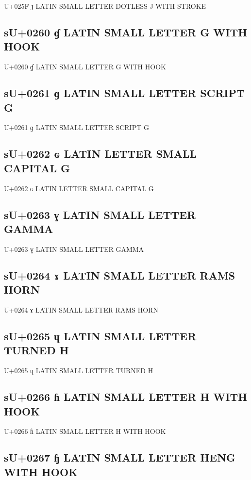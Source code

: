 U+025F ɟ LATIN SMALL LETTER DOTLESS J WITH STROKE

\subsection{sU+0260 ɠ LATIN SMALL LETTER G WITH HOOK}

U+0260 ɠ LATIN SMALL LETTER G WITH HOOK

\subsection{sU+0261 ɡ LATIN SMALL LETTER SCRIPT G}

U+0261 ɡ LATIN SMALL LETTER SCRIPT G

\subsection{sU+0262 ɢ LATIN LETTER SMALL CAPITAL G}

U+0262 ɢ LATIN LETTER SMALL CAPITAL G

\subsection{sU+0263 ɣ LATIN SMALL LETTER GAMMA}

U+0263 ɣ LATIN SMALL LETTER GAMMA

\subsection{sU+0264 ɤ LATIN SMALL LETTER RAMS HORN}

U+0264 ɤ LATIN SMALL LETTER RAMS HORN

\subsection{sU+0265 ɥ LATIN SMALL LETTER TURNED H}

U+0265 ɥ LATIN SMALL LETTER TURNED H

\subsection{sU+0266 ɦ LATIN SMALL LETTER H WITH HOOK}

U+0266 ɦ LATIN SMALL LETTER H WITH HOOK

\subsection{sU+0267 ɧ LATIN SMALL LETTER HENG WITH HOOK}

